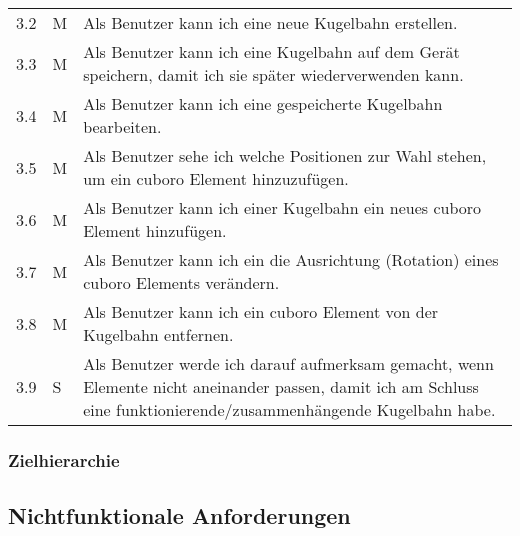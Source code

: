 \begin{enumerate}
\begin{longtable}{l l p{12cm}}
		3.2 & M & Als Benutzer kann ich eine neue Kugelbahn erstellen. \\
		3.3 & M & Als Benutzer kann ich eine Kugelbahn auf dem Gerät speichern, damit ich sie später wiederverwenden kann. \\
		3.4 & M & Als Benutzer kann ich eine gespeicherte Kugelbahn bearbeiten. \\
		3.5 & M & Als Benutzer sehe ich welche Positionen zur Wahl stehen, um ein cuboro Element hinzuzufügen. \\
		3.6 & M & Als Benutzer kann ich einer Kugelbahn ein neues cuboro Element hinzufügen. \\
		3.7 & M & Als Benutzer kann ich ein die Ausrichtung (Rotation) eines cuboro Elements verändern. \\
		3.8 & M & Als Benutzer kann ich ein cuboro Element von der Kugelbahn entfernen. \\
		3.9 & S & Als Benutzer werde ich darauf aufmerksam gemacht, wenn Elemente nicht aneinander passen, damit ich am Schluss eine funktionierende/zusammenhängende Kugelbahn habe. \\
		\hline
	\end{longtable}
\end{enumerate}

\subsubsection{Zielhierarchie}

\subsection{Nichtfunktionale Anforderungen}

